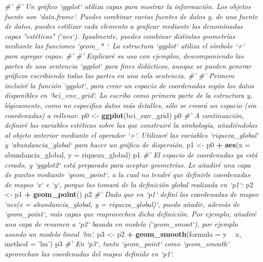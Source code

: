 \documentclass[11pt,]{article}
\newenvironment{Shaded}{\begin{snugshade}}{\end{snugshade}}
\newcommand{\KeywordTok}[1]{\textcolor[rgb]{0.13,0.29,0.53}{\textbf{#1}}}
\newcommand{\DataTypeTok}[1]{\textcolor[rgb]{0.13,0.29,0.53}{#1}}
\newcommand{\StringTok}[1]{\textcolor[rgb]{0.31,0.60,0.02}{#1}}
\newcommand{\CommentTok}[1]{\textcolor[rgb]{0.56,0.35,0.01}{\textit{#1}}}
\newcommand{\OperatorTok}[1]{\textcolor[rgb]{0.81,0.36,0.00}{\textbf{#1}}}
\newcommand{\NormalTok}[1]{#1}
\begin{document}
\begin{Shaded}
\begin{Highlighting}[]
{{{{{{{{{{{{{{{{{{{{{{{{{{{{{{{{{{{{{{{{{{{{{{{{{{{{{{{{{{{{{{{{{{{{{{{{{{{{{{{{{{{{\CommentTok{#'}
\CommentTok{#' Un gráfico `ggplot` utiliza capas para mostrar la información. Los objetos fuente son `data.frame`. Puedes combinar varias fuentes de datos y, de una fuente de datos, puedes estilizar cada elemento a graficar mediante las denominadas capas "estéticas" (`aes`). Igualmente, puedes combinar distintas geometrías mediante las funciones `geom_* `. La estructura `ggplot` utiliza el símbolo `+` para agregar capas.}
\CommentTok{#' }
\CommentTok{#' Explicaré su uso con ejemplos, descomponiendo las partes de una sentencia `ggplot` para fines didácticos, aunque se pueden generar gráficos escribiendo todas las partes en una sola sentencia.}
\CommentTok{#' }
\CommentTok{#' Primero incluiré la función `ggplot`, para crear un espacio de coordenadas según los datos disponibles en `bci_env_grid`. Lo escribo como primera parte de la estructura y, lógicamente, como no especifico datos más detalles, sólo se creará un espacio (sin coordenadas) a rellenar.}
\NormalTok{p0 <-}\StringTok{ }\KeywordTok{ggplot}\NormalTok{(bci_env_grid)}
\NormalTok{p0}
\CommentTok{#' A continuación, definiré las variables estéticas sobre las que construiré la simbología, añadiéndolas al objeto anterior mediante el operador `+`. Utilizaré las variables `riqueza_global` y `abundancia_global` para hacer un gráfico de dispersión.}
\NormalTok{p1 <-}\StringTok{ }\NormalTok{p0 }\OperatorTok{+}\StringTok{ }\KeywordTok{aes}\NormalTok{(}\DataTypeTok{x =}\NormalTok{ abundancia_global, }\DataTypeTok{y =}\NormalTok{ riqueza_global)}
\NormalTok{p1}
\CommentTok{#' El espacio de coordenadas ya está creado, y `ggplot2` está preparado para aceptar geometrías. Le añadiré una capa de puntos mediante `geom_point`, a la cual no tendré que definirle coordenadas de mapeo `x` e `y`, porque las tomará de la definición global realizada en `p1`:}
\NormalTok{p2 <-}\StringTok{ }\NormalTok{p1 }\OperatorTok{+}\StringTok{ }\KeywordTok{geom_point}\NormalTok{()}
\NormalTok{p2}
\CommentTok{#' Dado que en `p1` definí las coordenadas de mapeo `aes(x = abundancia_global, y = riqueza_global)`, puedo añadir, además de `geom_point`, más capas que reaprovechen dicha definición. Por ejemplo, añadiré una capa de resumen a `p2` basada en modelo (`geom_smoot`), por ejemplo usando un modelo lineal `lm`.}
\NormalTok{p3 <-}\StringTok{ }\NormalTok{p2 }\OperatorTok{+}\StringTok{ }\KeywordTok{geom_smooth}\NormalTok{(}\DataTypeTok{formula =}\NormalTok{ y }\OperatorTok{~}\StringTok{ }\NormalTok{x, }\DataTypeTok{method =} \StringTok{'lm'}\NormalTok{)}
\NormalTok{p3}
\CommentTok{#' En `p3`, tanto `geom_point` como `geom_smooth` aprovechan las coordenadas del mapeo definido en `p1`.}
}}}}}}}}}}}}}}}}}}}}}}}}}}}}}}}}}}}}}}}}}}}}}}}}}}}}}}}}}}}}}}}}}}}}}}}}}}}}}}}}}}}}
\end{Highlighting}
\end{Shaded}
\end{document}
